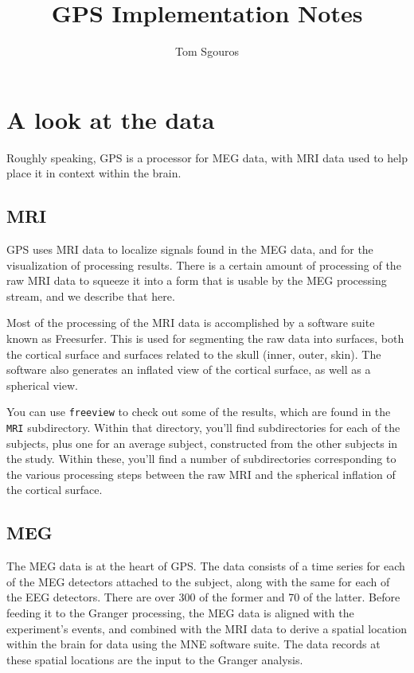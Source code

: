 \documentclass[11pt]{article}
\begin{document}
\title{GPS Implementation Notes}
\author{Tom Sgouros}

\newcommand{\dir}[1]{\texttt{#1}}
\newcommand{\exec}[1]{\texttt{#1}}

\newcommand{\fs}{Freesurfer\xspace}

\maketitle

\section{A look at the data}

Roughly speaking, GPS is a processor for MEG data, with MRI data used
to help place it in context within the brain.


\subsection{MRI}

GPS uses MRI data to localize signals found in the MEG data, and for
the visualization of processing results.  There is a certain amount of
processing of the raw MRI data to squeeze it into a form that is
usable by the MEG processing stream, and we describe that here.

Most of the processing of the MRI data is accomplished by a software
suite known as \fs.  This is used for segmenting the raw data
into surfaces, both the cortical surface and surfaces related to the
skull (inner, outer, skin).  The software also generates an inflated
view of the cortical surface, as well as a spherical view.

You can use \exec{freeview} to check out some of the results, which
are found in the \dir{MRI} subdirectory.  Within that directory,
you'll find subdirectories for each of the subjects, plus one for an
average subject, constructed from the other subjects in the study.
Within these, you'll find a number of subdirectories corresponding to
the various processing steps between the raw MRI and the spherical
inflation of the cortical surface.

\subsection{MEG}

The MEG data is at the heart of GPS.  The data consists of a time
series for each of the MEG detectors attached to the subject, along
with the same for each of the EEG detectors.  There are over 300 of
the former and 70 of the latter.  Before feeding it to the Granger
processing, the MEG data is aligned with the experiment's events, and
combined with the MRI data to derive a spatial location within the
brain for data using the MNE software suite.  The data records at
these spatial locations are the input to the Granger analysis.
\end{document}
